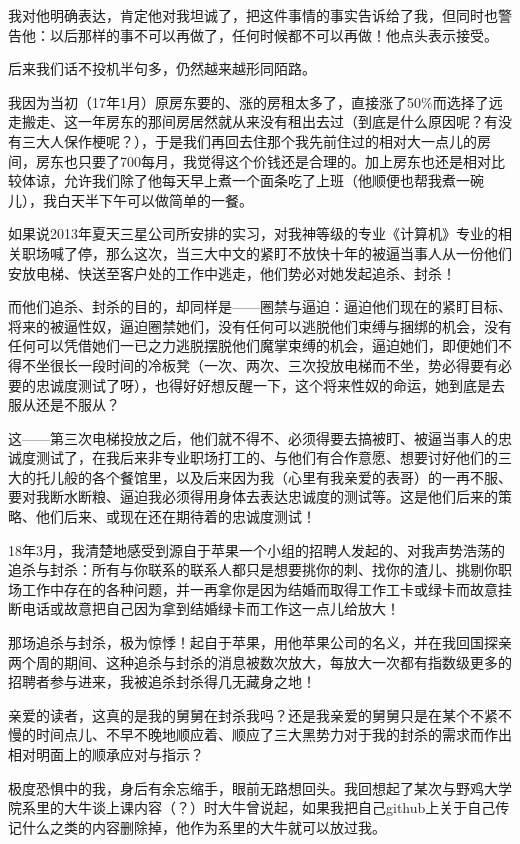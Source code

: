 \documentclass[9pt, b5paper]{article}
\begin{document}
我对他明确表达，肯定他对我坦诚了，把这件事情的事实告诉给了我，但同时也警告他：以后那样的事不可以再做了，任何时候都不可以再做！他点头表示接受。

后来我们话不投机半句多，仍然越来越形同陌路。

我因为当初（17年1月）原房东要的、涨的房租太多了，直接涨了50\%而选择了远走搬走、这一年房东的那间房居然就从来没有租出去过（到底是什么原因呢？有没有三大人保作梗呢？），于是我们再回去住那个我先前住过的相对大一点儿的房间，房东也只要了700每月，我觉得这个价钱还是合理的。加上房东也还是相对比较体谅，允许我们除了他每天早上煮一个面条吃了上班（他顺便也帮我煮一碗儿），我白天半下午可以做简单的一餐。

如果说2013年夏天三星公司所安排的实习，对我神等级的专业《计算机》专业的相关职场喊了停，那么这次，当三大中文的紧盯不放快十年的被逼当事人从一份他们安放电梯、快送至客户处的工作中逃走，他们势必对她发起追杀、封杀！

而他们追杀、封杀的目的，却同样是——圈禁与逼迫：逼迫他们现在的紧盯目标、将来的被逼性奴，逼迫圈禁她们，没有任何可以逃脱他们束缚与捆绑的机会，没有任何可以凭借她们一已之力逃脱摆脱他们魔掌束缚的机会，逼迫她们，即便她们不得不坐很长一段时间的冷板凳（一次、两次、三次投放电梯而不坐，势必得要有必要的忠诚度测试了呀），也得好好想反醒一下，这个将来性奴的命运，她到底是去服从还是不服从？

这——第三次电梯投放之后，他们就不得不、必须得要去搞被盯、被逼当事人的忠诚度测试了，在我后来非专业职场打工的、与他们有合作意愿、想要讨好他们的三大的托儿般的各个餐馆里，以及后来因为我（心里有我亲爱的表哥）的一再不服、要对我断水断粮、逼迫我必须得用身体去表达忠诚度的测试等。这是他们后来的策略、他们后来、或现在还在期待着的忠诚度测试！

18年3月，我清楚地感受到源自于苹果一个小组的招聘人发起的、对我声势浩荡的追杀与封杀：所有与你联系的联系人都只是想要挑你的刺、找你的渣儿、挑剔你职场工作中存在的各种问题，并一再拿你是因为结婚而取得工作工卡或绿卡而故意挂断电话或故意把自己因为拿到结婚绿卡而工作这一点儿给放大！

那场追杀与封杀，极为惊悸！起自于苹果，用他苹果公司的名义，并在我回国探亲两个周的期间、这种追杀与封杀的消息被数次放大，每放大一次都有指数级更多的招聘者参与进来，我被追杀封杀得几无藏身之地！

亲爱的读者，这真的是我的舅舅在封杀我吗？还是我亲爱的舅舅只是在某个不紧不慢的时间点儿、不早不晚地顺应着、顺应了三大黑势力对于我的封杀的需求而作出相对明面上的顺承应对与指示？

极度恐惧中的我，身后有余忘缩手，眼前无路想回头。我回想起了某次与野鸡大学院系里的大牛谈上课内容（？）时大牛曾说起，如果我把自己github上关于自己传记什么之类的内容删除掉，他作为系里的大牛就可以放过我。
\end{document}
